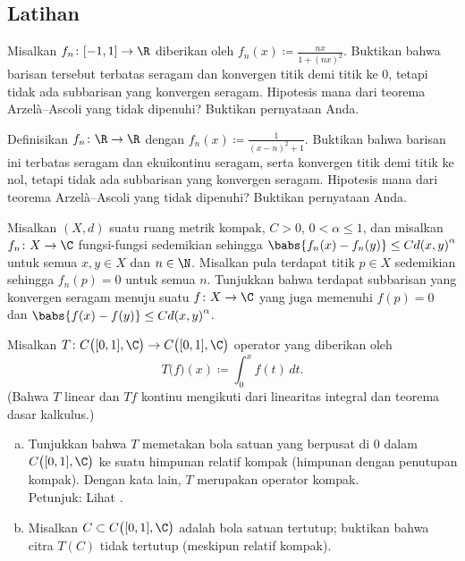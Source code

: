 \subsection{Latihan}

\begin{exercise}
Misalkan $f_n \colon [-1,1] \to \R$ diberikan oleh $f_n(x) \coloneqq \frac{nx}{1+{(nx)}^2}$.
Buktikan bahwa barisan tersebut terbatas seragam dan konvergen titik demi titik ke 0,
tetapi tidak ada
subbarisan yang konvergen seragam.
Hipotesis mana dari teorema Arzel\`a--Ascoli
yang tidak dipenuhi?  Buktikan pernyataan Anda.
\end{exercise}

\begin{exercise}
Definisikan $f_n \colon \R \to \R$ dengan $f_n(x) \coloneqq \frac{1}{{(x-n)}^2+1}$.  Buktikan bahwa
barisan ini terbatas seragam dan ekuikontinu seragam, serta
konvergen titik demi titik ke nol, tetapi tidak ada
subbarisan yang konvergen seragam.
Hipotesis mana dari teorema Arzel\`a--Ascoli
yang tidak dipenuhi?  Buktikan pernyataan Anda.
\end{exercise}

\begin{exercise}
Misalkan $(X,d)$ suatu ruang metrik kompak, $C > 0$, $0 < \alpha \leq 1$, dan
misalkan $f_n \colon X \to \C$ fungsi-fungsi sedemikian sehingga
$\babs{f_n(x)-f_n(y)} \leq C {d(x,y)}^\alpha$ untuk semua $x,y \in X$ dan
$n \in \N$.  Misalkan pula terdapat titik $p \in X$ sedemikian sehingga
$f_n(p) = 0$ untuk semua $n$.
Tunjukkan bahwa terdapat subbarisan yang konvergen seragam menuju
suatu $f \colon X \to \C$ yang juga memenuhi $f(p) = 0$ dan
$\babs{f(x)-f(y)} \leq C {d(x,y)}^\alpha$.
\end{exercise}

\begin{exercise}
Misalkan $T \colon C\bigl([0,1],\C\bigr) \to C\bigl([0,1],\C\bigr)$ operator yang
diberikan oleh
\begin{equation*}
T\bigl(f\bigr) (x) \coloneqq \int_0^x f(t)\, dt .
\end{equation*}
(Bahwa $T$ linear dan $Tf$ kontinu mengikuti dari
linearitas integral dan
teorema dasar kalkulus.)
\begin{enumerate}[a)]
\item
Tunjukkan bahwa $T$ memetakan bola satuan yang berpusat di 0 dalam $C\bigl([0,1],\C\bigr)$ ke suatu
himpunan relatif kompak (himpunan dengan penutupan kompak).
Dengan kata lain, $T$ merupakan operator kompak.\\
Petunjuk: Lihat .
\item
Misalkan $C \subset C\bigl([0,1],\C\bigr)$ adalah bola satuan tertutup;
buktikan bahwa
citra $T(C)$ tidak tertutup (meskipun relatif kompak).
\end{enumerate}
\end{exercise}

